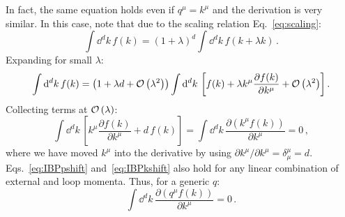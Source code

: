 \documentclass[main.tex]{subfiles}
\begin{document}
In fact, the same equation holds even if $q^\mu = k^\mu$ and the derivation is very similar. In this case, note that due to the scaling relation Eq.~\ref{eq:scaling}:
\begin{equation}
    \int \dd^d k\, f(k) = (1+\lambda)^d \int \dd^d k\, f(k+\lambda k) \,.
\end{equation}
Expanding for small $\lambda$:
\begin{equation}
    \int \mathrm{d}^d k\, f(k) = \left(1+\lambda d + \mathcal{O}\left(\lambda^2\right)\right) \int \mathrm{d}^d k\, \left[ f(k) + \lambda k^\mu \frac{\partial f(k)}{\partial k^\mu} + \mathcal{O}\left(\lambda^2\right) \right].
\end{equation}
Collecting terms at $\mathcal{O}\left(\lambda\right)$:
\begin{equation} \label{eq:IBPkshift}
    \int \dd^d k\, \left[ k^\mu \frac{\partial f(k)}{\partial k^\mu} + d\, f(k) \right] = \int \dd^d k\, \frac{\partial(k^\mu f(k))}{\partial k^\mu} = 0\,,
\end{equation}
where we have moved $k^\mu$ into the derivative by using $\partial k^\mu / \partial k^\mu = \delta^\mu_\mu=d$. Eqs.~\ref{eq:IBPpshift} and~\ref{eq:IBPkshift} also hold for any linear combination of external and loop momenta. Thus, for a generic $q$:
\begin{equation} \label{eq:IBPboundaryterm}
    \int \dd^d k\, \frac{\partial(q^\mu f(k))}{\partial k^\mu} = 0\,.
\end{equation}
\end{document}
